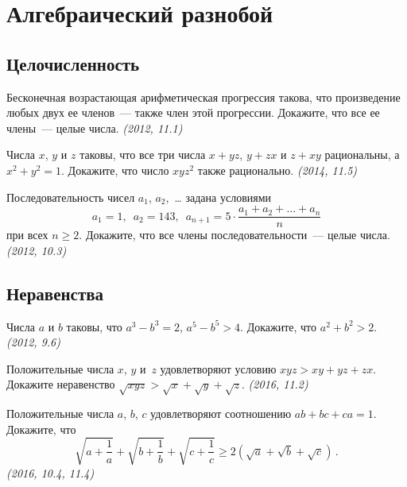 
\section*{Алгебраический разнобой}


\subsection*{Целочисленность}

\begin{problems}

\item
Бесконечная возрастающая арифметическая прогрессия такова, что произведение
любых двух ее членов~--- также член этой прогрессии.
Докажите, что все ее члены~--- целые числа.
\emph{(2012, 11.1)}

\item
Числа $x$, $y$ и $z$ таковы, что все три числа $x + y z$, $y + z x$ и $z + x y$
рациональны, а $x^2 + y^2 = 1$.
Докажите, что число $x y z^2$ также рационально.
\emph{(2014, 11.5)}

\item
Последовательность чисел $a_1$, $a_2$,~{\ldots} задана условиями
\[
    a_1 = 1
,\enspace
    a_2 = 143
,\enspace
    a_{n+1}
=
    5 \cdot \frac{a_{1} + a_{2} + \ldots + a_{n}}{n}
\]
при всех $n \geq 2$.
Докажите, что все члены последовательности~--- целые числа.
\emph{(2012, 10.3)}

\end{problems}

\subsection*{Неравенства}

\begin{problems}

\item
Числа $a$ и $b$ таковы, что $a^3 - b^3 = 2$,
$a^5 - b^5 > 4$.
Докажите, что $a^2 + b^2 > 2$.
\emph{(2012, 9.6)}

\item
Положительные числа $x$, $y$ и~$z$ удовлетворяют условию $xyz > xy + yz + zx$.
Докажите неравенство
$\sqrt{xyz} > \sqrt{x} + \sqrt{y} + \sqrt{z}$.
\emph{(2016, 11.2)}

\item
Положительные числа $a$, $b$, $c$ удовлетворяют соотношению
$ab + bc + ca = 1$.
Докажите, что
\[
    \sqrt{a + \frac{1}{a}} +
    \sqrt{b + \frac{1}{b}} +
    \sqrt{c + \frac{1}{c}}
\geq
    2 (\sqrt{a} + \sqrt{b} + \sqrt{c})
\, . \]
\emph{(2016, 10.4, 11.4)}

\end{problems}

